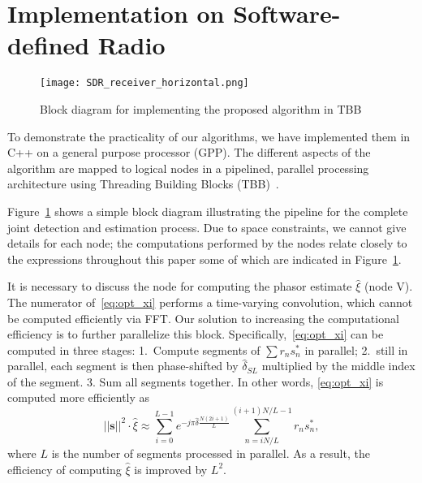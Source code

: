 \section{Implementation on Software-defined Radio}%
\label{sec:implementation_on_SDR}

\begin{figure}[t]
    \centerline{\texttt{[image: SDR\_receiver\_horizontal.png]}}
    \caption{Block diagram for implementing the proposed algorithm in TBB}
    \label{fig:SDR_receiver}
    \end{figure}

To demonstrate the practicality of our algorithms, we have implemented them in C++ on a general
purpose processor (GPP).
The different aspects of the algorithm are mapped to logical nodes in a pipelined, parallel processing architecture
using Threading Building Blocks (TBB)~\cite{Michael_19}.

Figure~\ref{fig:SDR_receiver} shows a simple block diagram
illustrating the pipeline for the complete joint detection and
estimation process.
Due to space constraints, we cannot give details for each node; the
computations performed by the nodes relate closely to the expressions
throughout this paper some of which are indicated in Figure~\ref{fig:SDR_receiver}.

It is necessary to discuss the node for computing the phasor estimate $\hat{\xi}$ (node V). 
The numerator of~\eqref{eq:opt_xi} performs a time-varying
convolution,
which cannot be computed efficiently via FFT.
Our solution to increasing the computational efficiency is to further
parallelize this block.
Specifically,~\eqref{eq:opt_xi} can be computed in three stages:
1.~Compute  segments of $\sum r_ns_n^*$ in  parallel;
2.~still in parallel, each segment is then phase-shifted by $\hat{\delta}_{SL}$
multiplied by the middle index of the 
segment.
3. Sum all segments together.
In other words, \eqref{eq:opt_xi} is computed more efficiently as
\begin{equation}
  \label{eq:refined_opt_S}
  ||\bm{s}||^2\cdot\hat{\xi} \approx \sum_{i=0}^{L-1} e^{-j\pi \hat{\delta}\frac{N(2i+1)}{L}}
  \sum_{n=iN/L}^{(i+1)N/L-1}r_ns_n^*,
\end{equation}
where $L$ is the number of segments processed in parallel.
As a result,
the efficiency of computing $\hat{\xi}$ is improved by $L^2$.

